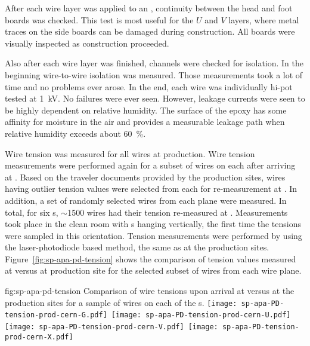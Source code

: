 
After each wire layer was applied to an , continuity between the head and foot boards was checked.  This test is most useful for the $U$ and $V$ layers, where metal traces on the side boards can be damaged during construction. All boards were visually inspected as construction proceeded.

Also after each wire layer was finished, channels were checked for isolation.  In the beginning wire-to-wire isolation was measured. Those measurements took a lot of time and no problems ever arose.  In the end, each wire was individually hi-pot tested at \SI{1}{kV}. No failures were ever seen. However, leakage currents were seen to be highly dependent on relative humidity.  The surface of the epoxy has some affinity for moisture in the air and provides a measurable leakage path when relative humidity exceeds about \SI{60}{\%}.

Wire tension was measured for all wires at production. Wire tension measurements were performed again for a subset of wires on each  after arriving at .  Based on the traveler documents provided by the production sites, wires having outlier tension values were selected from each  for re-measurement at . In addition, a set of randomly selected wires from each plane were measured. In total, for six s, $\sim$1500 wires had their tension re-measured at . Measurements took place in the clean room with s hanging vertically, the first time the tensions were sampled in this orientation. Tension measurements were performed by using the laser-photodiode based method, the same as at the production sites. Figure~\ref{fig:sp-apa-pd-tension} shows the comparison of tension values measured at  versus at production site for the selected subset of wires from each wire plane.

\begin{dunefigure}{fig:sp-apa-pd-tension}
{Comparison of wire tensions upon arrival at  versus at the production sites for a sample of wires on each of the  s.}
\mbox{\texttt{[image: sp-apa-PD-tension-prod-cern-G.pdf]} %
\texttt{[image: sp-apa-PD-tension-prod-cern-U.pdf]}} \\
\vspace{3mm}
\mbox{\texttt{[image: sp-apa-PD-tension-prod-cern-V.pdf]} %
\texttt{[image: sp-apa-PD-tension-prod-cern-X.pdf]}}
\end{dunefigure}

